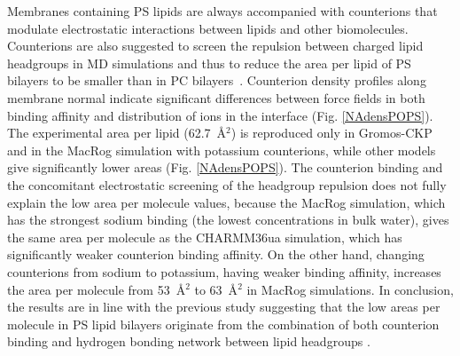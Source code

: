 \documentclass[aps,prl,superscriptaddress,twocolumn]{revtex4}
\begin{document}
Membranes containing PS lipids are always accompanied with counterions that
modulate electrostatic interactions between lipids and other biomolecules. 
Counterions are also suggested to screen the repulsion between charged lipid headgroups 
in MD simulations and thus to reduce the area per lipid of PS bilayers to be smaller than in PC
bilayers~\cite{pandit02,mukhopadhyay04,pedersen06}. 
Counterion density profiles along membrane normal 
indicate significant differences between force fields in both binding affinity
and distribution of ions in the interface (Fig. \ref{NAdensPOPS}).
The experimental area per lipid (62.7~\AA$^2$) \cite{pan14} 
is reproduced only in Gromos-CKP and in the MacRog simulation
with potassium counterions, while other models give significantly lower areas (Fig. \ref{NAdensPOPS}).
The counterion binding and the concomitant electrostatic screening of the headgroup
repulsion does not fully explain the low area per molecule values,
because the MacRog simulation, which has the strongest sodium binding
(the lowest concentrations in bulk water), gives the same area per molecule
as the CHARMM36ua simulation, which has significantly weaker counterion binding
affinity. On the other hand, changing counterions from sodium to potassium, having weaker binding
affinity, increases the area per molecule from 53~\AA$^2$ to 63~\AA$^2$ in MacRog simulations.
In conclusion, the results are in line with the previous study suggesting that the
low areas per molecule in PS lipid bilayers originate from the combination
of both counterion binding and hydrogen bonding network between lipid
headgroups \cite{petrache04}.
\end{document}
